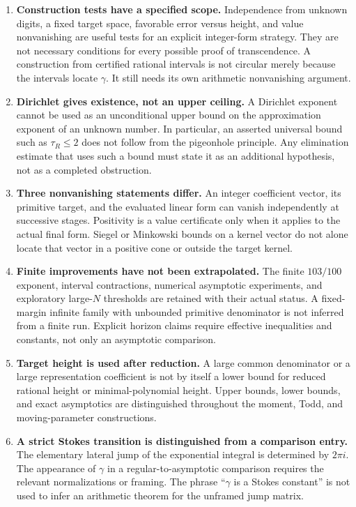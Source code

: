 \documentclass[11pt,a4paper]{article}
\theoremstyle{definition}
\theoremstyle{remark}
\numberwithin{equation}{section}
\begin{document}
\begin{enumerate}[leftmargin=*,itemsep=6pt]
\item \textbf{Construction tests have a specified scope.}
Independence from unknown digits, a fixed target space, favorable error
versus height, and value nonvanishing are useful tests for an explicit
integer-form strategy. They are not necessary conditions for every
possible proof of transcendence. A construction from certified rational
intervals is not circular merely because the intervals locate $\gamma$.
It still needs its own arithmetic nonvanishing argument.

\item \textbf{Dirichlet gives existence, not an upper ceiling.}
A Dirichlet exponent cannot be used as an unconditional upper bound on
the approximation exponent of an unknown number. In particular, an
asserted universal bound such as $\tau_R\le2$ does not follow from the
pigeonhole principle. Any elimination estimate that uses such a bound
must state it as an additional hypothesis, not as a completed obstruction.

\item \textbf{Three nonvanishing statements differ.}
An integer coefficient vector, its primitive target, and the evaluated
linear form can vanish independently at successive stages. Positivity
is a value certificate only when it applies to the actual final form.
Siegel or Minkowski bounds on a kernel vector do not alone locate that
vector in a positive cone or outside the target kernel.

\item \textbf{Finite improvements have not been extrapolated.}
The finite $103/100$ exponent, interval contractions, numerical
asymptotic experiments, and exploratory large-$N$ thresholds are retained
with their actual status. A fixed-margin infinite family with unbounded
primitive denominator is not inferred from a finite run. Explicit horizon
claims require effective inequalities and constants, not only an
asymptotic comparison.

\item \textbf{Target height is used after reduction.}
A large common denominator or a large representation coefficient is not
by itself a lower bound for reduced rational height or minimal-polynomial
height. Upper bounds, lower bounds, and exact asymptotics are distinguished
throughout the moment, Todd, and moving-parameter constructions.

\item \textbf{A strict Stokes transition is distinguished from a comparison
entry.}
The elementary lateral jump of the exponential integral is determined by
$2\pi i$. The appearance of $\gamma$ in a regular-to-asymptotic comparison
requires the relevant normalizations or framing. The phrase ``$\gamma$ is
a Stokes constant'' is not used to infer an arithmetic theorem for the
unframed jump matrix.


\end{enumerate}
\end{document}
